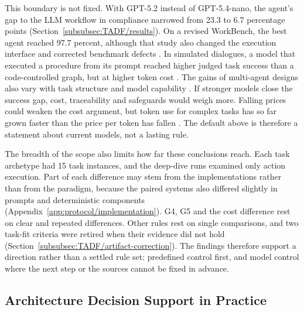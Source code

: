 This boundary is not fixed. With GPT-5.2 instead of GPT-5.4-nano, the agent's gap to the LLM workflow in compliance narrowed from 23.3 to 6.7 percentage points (Section~\ref{subsubsec:TADF/results}). On a revised WorkBench, the best agent reached 97.7 percent, although that study also changed the execution interface and corrected benchmark defects \parencite{stylesWorkBenchRevisitedWorkplace2026}. In simulated dialogues, a model that executed a procedure from its prompt reached higher judged task success than a code-controlled graph, but at higher token cost \parencite{dennisInContextPromptingObsoletes2026}. The gains of multi-agent designs also vary with task structure and model capability \parencite{kimScienceScalingAgent2025}. If stronger models close the success gap, cost, traceability and safeguards would weigh more. Falling prices could weaken the cost argument, but token use for complex tasks has so far grown faster than the price per token has fallen \parencite{tinkoffStateAI2026}. The default above is therefore a statement about current models, not a lasting rule.

The breadth of the scope also limits how far these conclusions reach. Each task archetype had 15 task instances, and the deep-dive runs examined only action execution. Part of each difference may stem from the implementations rather than from the paradigm, because the paired systems also differed slightly in prompts and deterministic components (Appendix~\ref{app:protocol/implementation}). G4, G5 and the cost difference rest on clear and repeated differences. Other rules rest on single comparisons, and two task-fit criteria were retired when their evidence did not hold (Section~\ref{subsubsec:TADF/artifact-correction}). The findings therefore support a direction rather than a settled rule set: predefined control first, and model control where the next step or the sources cannot be fixed in advance.

\subsection{Architecture Decision Support in Practice}
\label{subsec:discussion/practice}

